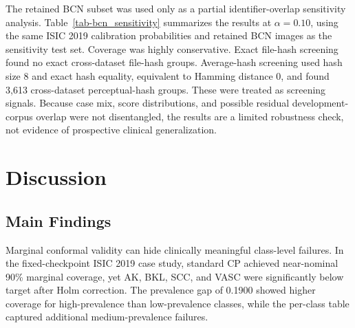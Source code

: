 ﻿\documentclass[preprint,12pt]{elsarticle}
\begin{document}
The retained BCN subset was used only as a partial identifier-overlap sensitivity analysis. Table~\ref{tab-bcn_sensitivity} summarizes the results at $\alpha=0.10$, using the same ISIC 2019 calibration probabilities and retained BCN images as the sensitivity test set. Coverage was highly conservative. Exact file-hash screening found no exact cross-dataset file-hash groups. Average-hash screening used hash size 8 and exact hash equality, equivalent to Hamming distance 0, and found 3,613 cross-dataset perceptual-hash groups. These were treated as screening signals. Because case mix, score distributions, and possible residual development-corpus overlap were not disentangled, the results are a limited robustness check, not evidence of prospective clinical generalization.

\begin{table}[htbp]
\centering
\caption{Partial identifier-overlap BCN20000 sensitivity analysis at $\alpha=0.10$. The analysis used 12,204 mappable eight-class images retained after non-destructive overlap filtering.}
\label{tab-bcn_sensitivity}
\end{table}

\section{Discussion}
\label{sec-discussion}

\subsection{Main Findings}

Marginal conformal validity can hide clinically meaningful class-level failures. In the fixed-checkpoint ISIC 2019 case study, standard CP achieved near-nominal 90\% marginal coverage, yet AK, BKL, SCC, and VASC were significantly below target after Holm correction. The prevalence gap of 0.1900 showed higher coverage for high-prevalence than low-prevalence classes, while the per-class table captured additional medium-prevalence failures.
\end{document}
